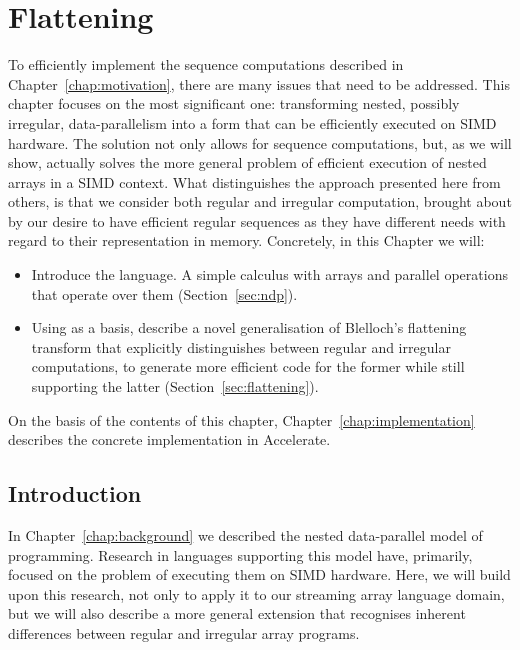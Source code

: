 \chapter{Flattening}%
\label{chap:theory}

To efficiently implement the sequence computations described in Chapter~\ref{chap:motivation}, there are many issues that need to be addressed. This chapter focuses on the most significant one: transforming nested, possibly irregular, data-parallelism into a form that can be efficiently executed on SIMD hardware. The solution not only allows for sequence computations, but, as we will show, actually solves the more general problem of efficient execution of nested arrays in a SIMD context. What distinguishes the approach presented here from others, is that we consider both regular and irregular computation, brought about by our desire to have efficient regular sequences as they have different needs with regard to their representation in memory. Concretely, in this Chapter we will:
%
\begin{itemize}
\item Introduce the \ndp{} language. A simple calculus with arrays and parallel operations that operate over them (Section~\ref{sec:ndp}).
\item Using \ndp{} as a basis, describe a novel generalisation of Blelloch's flattening transform that explicitly distinguishes between regular and irregular computations, to generate more efficient code for the former while still supporting the latter (Section~\ref{sec:flattening}).
\end{itemize}

On the basis of the contents of this chapter, Chapter~\ref{chap:implementation} describes the concrete implementation in Accelerate.

\section{Introduction}

In Chapter~\ref{chap:background} we described the nested data-parallel model of programming. Research in languages supporting this model have, primarily, focused on the problem of executing them on SIMD hardware. Here, we will build upon this research, not only to apply it to our streaming array language domain, but we will also describe a more general extension that recognises inherent differences between regular and irregular array programs.


